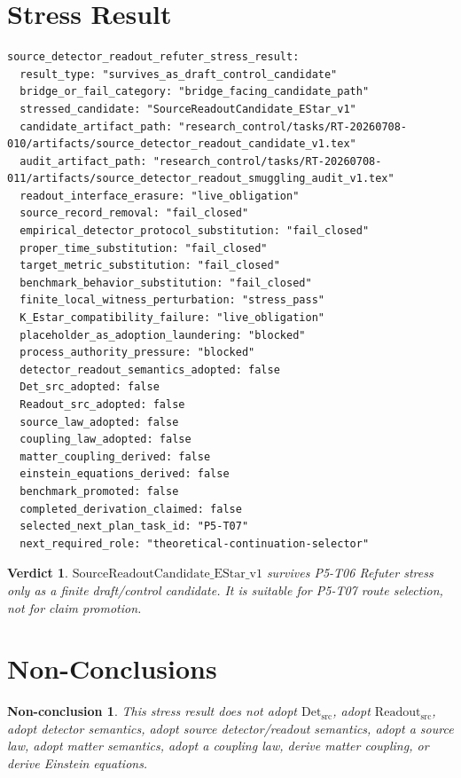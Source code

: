 \documentclass[11pt]{article}
\newcommand{\ReadoutSrc}{\mathrm{Readout}_{\mathrm{src}}}
\newcommand{\DetSrc}{\mathrm{Det}_{\mathrm{src}}}
\newtheorem{verdict}{Verdict}
\newtheorem{nonconclusion}{Non-conclusion}
\begin{document}
\section{Stress Result}

\begin{verbatim}
source_detector_readout_refuter_stress_result:
  result_type: "survives_as_draft_control_candidate"
  bridge_or_fail_category: "bridge_facing_candidate_path"
  stressed_candidate: "SourceReadoutCandidate_EStar_v1"
  candidate_artifact_path: "research_control/tasks/RT-20260708-010/artifacts/source_detector_readout_candidate_v1.tex"
  audit_artifact_path: "research_control/tasks/RT-20260708-011/artifacts/source_detector_readout_smuggling_audit_v1.tex"
  readout_interface_erasure: "live_obligation"
  source_record_removal: "fail_closed"
  empirical_detector_protocol_substitution: "fail_closed"
  proper_time_substitution: "fail_closed"
  target_metric_substitution: "fail_closed"
  benchmark_behavior_substitution: "fail_closed"
  finite_local_witness_perturbation: "stress_pass"
  K_Estar_compatibility_failure: "live_obligation"
  placeholder_as_adoption_laundering: "blocked"
  process_authority_pressure: "blocked"
  detector_readout_semantics_adopted: false
  Det_src_adopted: false
  Readout_src_adopted: false
  source_law_adopted: false
  coupling_law_adopted: false
  matter_coupling_derived: false
  einstein_equations_derived: false
  benchmark_promoted: false
  completed_derivation_claimed: false
  selected_next_plan_task_id: "P5-T07"
  next_required_role: "theoretical-continuation-selector"
\end{verbatim}

\begin{verdict}
\(\mathrm{SourceReadoutCandidate\_EStar\_v1}\) survives P5-T06 Refuter
stress only as a finite draft/control candidate. It is suitable for P5-T07
route selection, not for claim promotion.
\end{verdict}

\section{Non-Conclusions}

\begin{nonconclusion}
This stress result does not adopt \(\DetSrc\), adopt \(\ReadoutSrc\), adopt
detector semantics, adopt source detector/readout semantics, adopt a source
law, adopt matter semantics, adopt a coupling law, derive matter coupling, or
derive Einstein equations.
\end{nonconclusion}
\end{document}
